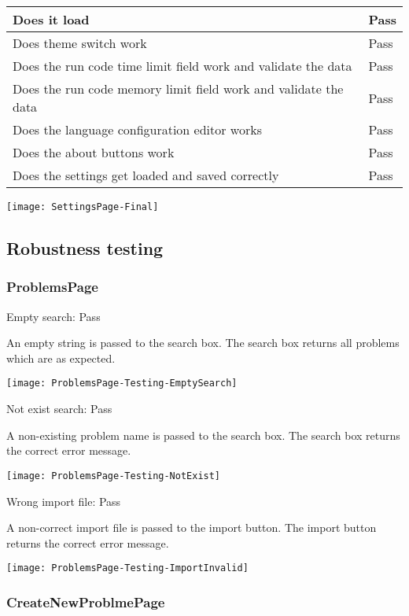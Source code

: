 \documentclass[report.tex]{subfiles}
\begin{document}
\begin{tabulary}{\linewidth}{|L|l|}
    \hline
    Does it load & Pass \\
    \hline
    Does theme switch work & Pass \\
    \hline
    Does the run code time limit field work and validate the data & Pass \\
    \hline
    Does the run code memory limit field work and validate the data & Pass \\
    \hline
    Does the language configuration editor works & Pass \\
    \hline
    Does the about buttons work & Pass \\
    \hline
    Does the settings get loaded and saved correctly & Pass \\
    \hline
\end{tabulary}

\texttt{[image: SettingsPage-Final]}

\subsection{Robustness testing}

\subsubsection{ProblemsPage}

Empty search: Pass

An empty string is passed to the search box. The search box returns all problems which are as expected.

\texttt{[image: ProblemsPage-Testing-EmptySearch]}

Not exist search: Pass

A non-existing problem name is passed to the search box. The search box returns the correct error message.

\texttt{[image: ProblemsPage-Testing-NotExist]}

Wrong import file: Pass

A non-correct import file is passed to the import button. The import button returns the correct error message.

\texttt{[image: ProblemsPage-Testing-ImportInvalid]}

\subsubsection{CreateNewProblmePage}
\end{document}

